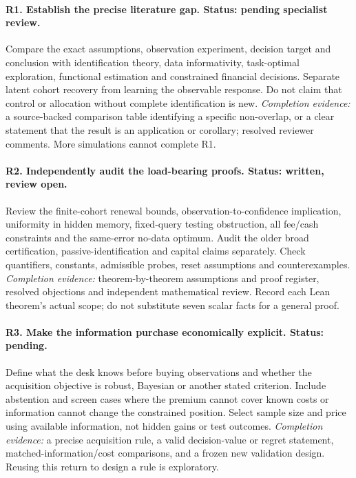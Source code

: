 \paragraph{R1. Establish the precise literature gap. Status: pending specialist review.}
Compare the exact assumptions, observation experiment, decision target and
conclusion with identification theory, data informativity, task-optimal
exploration, functional estimation and constrained financial decisions. Separate
latent cohort recovery from learning the observable response. Do not claim
that control or allocation without complete identification is new.
\emph{Completion evidence:} a source-backed comparison table identifying a
specific non-overlap, or a clear statement that the result is an application
or corollary; resolved reviewer comments. More simulations cannot complete R1.

\paragraph{R2. Independently audit the load-bearing proofs. Status: written, review open.}
Review the finite-cohort renewal bounds, observation-to-confidence implication,
uniformity in hidden memory, fixed-query testing obstruction, all fee/cash
constraints and the same-error no-data optimum. Audit the older broad
certification, passive-identification and capital claims separately. Check
quantifiers, constants, admissible probes, reset assumptions and counterexamples.
\emph{Completion evidence:} theorem-by-theorem assumptions and proof register,
resolved objections and independent mathematical review. Record each Lean
theorem's actual scope; do not substitute seven scalar facts for a general proof.

\paragraph{R3. Make the information purchase economically explicit. Status: pending.}
Define what the desk knows before buying observations and whether the acquisition
objective is robust, Bayesian or another stated criterion. Include abstention
and screen cases where the premium cannot cover known costs or information
cannot change the constrained position. Select sample size and price using
available information, not hidden gains or test outcomes.
\emph{Completion evidence:} a precise acquisition rule, a valid decision-value
or regret statement, matched-information/cost comparisons, and a frozen new
validation design. Reusing this return to design a rule is exploratory.

